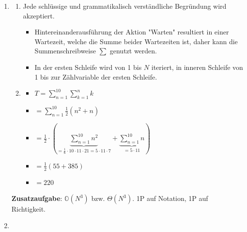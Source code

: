 \documentclass[12pt]{article}
\begin{document}
{\begin{enumerate}
\begin{enumerate}
\item $p(x) = \frac{1}{2}(x+1)(x-1)(x-2)$
\begin{itemize}
\item Form ist korrekt (Produkt von Linearfaktoren mit Koeffizient)
\item Wert für Koeffizienten ist korrekt
\item Werte für Nullstellen sind korrekt
\end{itemize}

\end{enumerate}

\item
\begin{enumerate}

\item Jede schlüssige und grammatikalisch verständliche Begründung wird akzeptiert.
\begin{itemize}
\item Hintereinanderausführung der Aktion "Warten" resultiert in einer Wartezeit, welche die Summe beider Wartezeiten ist, daher kann die Summenschreibweise $\sum$ genutzt werden.
\item In der ersten Schleife wird von 1 bis $N$ iteriert, in inneren Schleife von 1 bis zur Zählvariable der ersten Schleife.
\end{itemize}

\item
\begin{itemize}
\item $T=\sum\limits_{n=1}^{10}\sum\limits_{k=1}^n k$
\item $=\sum\limits_{n=1}^{10} \frac{1}{2}(n^2+n)$
\item $=\frac{1}{2} \cdot (\underbrace{\sum\limits_{n=1}^{10} n^2}_{ = \frac{1}{6}\cdot 10 \cdot 11 \cdot 21 = 5 \cdot 11 \cdot 7} + \underbrace{\sum\limits_{n=1}^{10} n}_{= 5\cdot 11})$
\item $ = \frac{1}{2}(55+385)$
\item $= 220$
\end{itemize}

\end{enumerate}

\bigskip

\textbf{Zusatzaufgabe}: $\mathbb{O}(N^3)$ bzw. $\Theta(N^3)$. 1P auf Notation, 1P auf Richtigkeit.

\newpage


\item
\begin{enumerate}


\end{enumerate}
\end{enumerate}}
\end{document}
